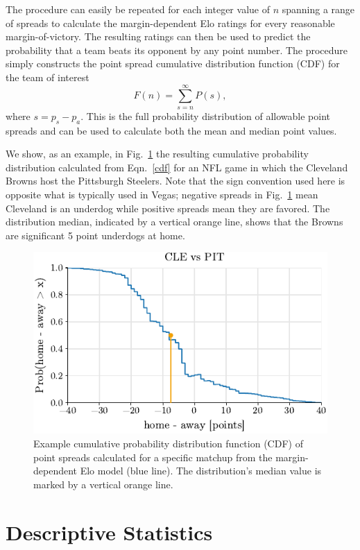 \documentclass[aps,prc,reprint,amsmath,superscriptaddress,nofootinbib]{revtex4-1}
\begin{document}
The procedure can easily be repeated for each integer value of $n$ spanning a range of spreads to calculate the margin-dependent Elo ratings for every reasonable margin-of-victory.
The resulting ratings can then be used to predict the probability that a team beats its opponent by any point number.
The procedure simply constructs the point spread cumulative distribution function (CDF) for the team of interest
\begin{equation}
  \label{cdf}
  F(n) = \sum_{s=n}^\infty P(s),
\end{equation}
where $s = p_s - p_a$.
This is the full probability distribution of allowable point spreads and can be used to calculate both the mean and median point values.

We show, as an example, in Fig.~\ref{fig:example} the resulting cumulative probability distribution calculated from Eqn.~\eqref{cdf} for an NFL game in which the Cleveland Browns host the Pittsburgh Steelers. 
Note that the sign convention used here is opposite what is typically used in Vegas; negative spreads in Fig.~\ref{fig:example} mean Cleveland is an underdog while positive spreads mean they are favored.
The distribution median, indicated by a vertical orange line, shows that the Browns are significant 5 point underdogs at home.

\begin{figure}
  \includegraphics{example_distribution}
  \caption{\label{fig:example} Example cumulative probability distribution function (CDF) of point spreads calculated for a specific matchup from the margin-dependent Elo model (blue line). The distribution's median value is marked by a vertical orange line.}
\end{figure}

\section{Descriptive Statistics}
\end{document}
